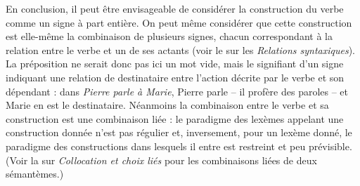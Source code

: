 {    En conclusion, il peut être envisageable de considérer la construction du verbe comme un signe à part entière. On peut même considérer que cette construction est elle-même la combinaison de plusieurs signes, chacun correspondant à la relation entre le verbe et un de ses actants (voir le  sur les \textit{Relations syntaxiques}). La préposition ne serait donc pas ici un mot vide, mais le signifiant d’un signe indiquant une relation de destinataire entre l’action décrite par le verbe et son dépendant : dans \textit{Pierre parle à Marie}, Pierre parle – il profère des paroles – et Marie en est le destinataire. Néanmoins la combinaison entre le verbe et sa construction est une combinaison liée : le paradigme des lexèmes appelant une construction donnée n’est pas régulier et, inversement, pour un lexème donné, le paradigme des constructions dans lesquels il entre est restreint et peu prévisible. (Voir la  sur \textit{Collocation et choix liés} pour les combinaisons liées de deux sémantèmes.)

}
